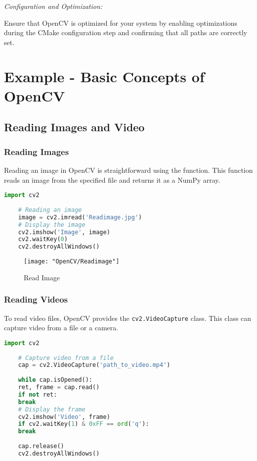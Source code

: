 \textit{Configuration and Optimization:}

Ensure that OpenCV is optimized for your system by enabling optimizations during the CMake configuration step and confirming that all paths are correctly set.\cite{OpenCVTeam:2024}


\section{Example - Basic Concepts of OpenCV}
\subsection{Reading Images and Video}
\subsubsection{Reading Images}
Reading an image in OpenCV is straightforward using the  function. This function reads an image from the specified file and returns it as a NumPy array.\cite{Jasmcaus:2024}

\begin{lstlisting}[language=Python]
	import cv2
	
	# Reading an image
	image = cv2.imread('Readimage.jpg')
	# Display the image
	cv2.imshow('Image', image)
	cv2.waitKey(0)
	cv2.destroyAllWindows()
\end{lstlisting}

\begin{figure}[h]
	\centering
	\texttt{[image: "OpenCV/Readimage"]}
	\caption{Read Image}\label{Readimage}
\end{figure}

\subsubsection{Reading Videos}
To read video files, OpenCV provides the \texttt{cv2.VideoCapture} class. This class can capture video from a file or a camera.\cite{OpenCVTeam:2024}

\begin{lstlisting}[language=Python]
	import cv2
	
	# Capture video from a file
	cap = cv2.VideoCapture('path_to_video.mp4')
	
	while cap.isOpened():
	ret, frame = cap.read()
	if not ret:
	break
	# Display the frame
	cv2.imshow('Video', frame)
	if cv2.waitKey(1) & 0xFF == ord('q'):
	break
	
	cap.release()
	cv2.destroyAllWindows()
\end{lstlisting}

